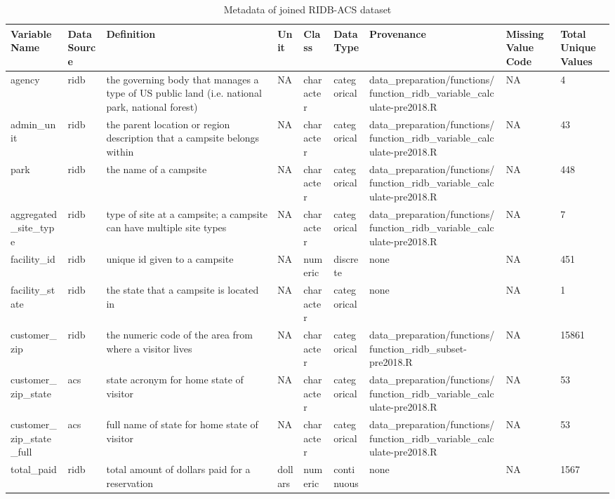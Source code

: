 \documentclass[
]{book}
\begin{document}
\begin{table}

\caption{\label{tab:unnamed-chunk-4}Metadata of joined RIDB-ACS dataset}
\begin{tabular}[t]{l|l|l|l|l|l|l|l|l}
\hline
Variable Name & Data Source & Definition & Unit & Class & Data Type & Provenance & Missing Value Code & Total Unique Values\\
\hline
agency & ridb & the governing body that manages a type of US public land (i.e. national park, national forest) & NA & character & categorical & data\_preparation/functions/function\_ridb\_variable\_calculate-pre2018.R & NA & 4\\
\hline
admin\_unit & ridb & the parent location or region description that a campsite belongs within & NA & character & categorical & data\_preparation/functions/function\_ridb\_variable\_calculate-pre2018.R & NA & 43\\
\hline
park & ridb & the name of a campsite & NA & character & categorical & data\_preparation/functions/function\_ridb\_variable\_calculate-pre2018.R & NA & 448\\
\hline
aggregated\_site\_type & ridb & type of site at a campsite; a campsite can have multiple site types & NA & character & categorical & data\_preparation/functions/function\_ridb\_variable\_calculate-pre2018.R & NA & 7\\
\hline
facility\_id & ridb & unique id given to a campsite & NA & numeric & discrete & none & NA & 451\\
\hline
facility\_state & ridb & the state that a campsite is located in & NA & character & categorical & none & NA & 1\\
\hline
customer\_zip & ridb & the numeric code of the area from where a visitor lives & NA & character & categorical & data\_preparation/functions/function\_ridb\_subset-pre2018.R & NA & 15861\\
\hline
customer\_zip\_state & acs & state acronym for home state of visitor & NA & character & categorical & data\_preparation/functions/function\_ridb\_variable\_calculate-pre2018.R & NA & 53\\
\hline
customer\_zip\_state\_full & acs & full name of state for home state of visitor & NA & character & categorical & data\_preparation/functions/function\_ridb\_variable\_calculate-pre2018.R & NA & 53\\
\hline
total\_paid & ridb & total amount of dollars paid for a reservation & dollars & numeric & continuous & none & NA & 1567\\

\end{tabular}
\end{table}
\end{document}
